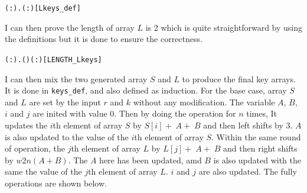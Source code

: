 \documentclass{article}
\begin{document}
\begin{alltt}
\HOLTokenTurnstile{} \HOLSymConst{\HOLTokenForall{}}( :).   \HOLSymConst{=}   ( :)\hfill{[Lkeys_def]}
\end{alltt}

I can then prove the length of array $L$ is 2 which is quite straightforward by using the definitions but it is done to ensure the correctness.

\begin{alltt}
\HOLTokenTurnstile{} \HOLSymConst{\HOLTokenForall{}}( :).  ( ) \HOLSymConst{=} ( :)\hfill{[LENGTH_Lkeys]}
\end{alltt}

I can then mix the two generated array $S$ and $L$ to produce the final key arrays. It is done in \verb|keys_def|,
and also defined as induction. For the base case, array $S$ and $L$ are set by the input $r$ and $k$ without any
modification. The variable $A$, $B$, $i$ and $j$ are inited with value 0. Then by doing the operation for $n$ times,
It updates the $i$th element of array $S$ by $S[i]+\;A+\;B$ and then left shifts by 3. $A$ is also updated to the
value of the $i$th element of array $S$. Within the same round of operation, the $j$th element of array $L$ by $L[j]+\;A+\;B$
and then right shifts by $w2n(A+B)$. The $A$ here has been updated, amd $B$ is also updated
with the same the value of the $j$th element of array $L$. $i$ and $j$ are also updated. The fully operations are shown
below.
\end{document}
